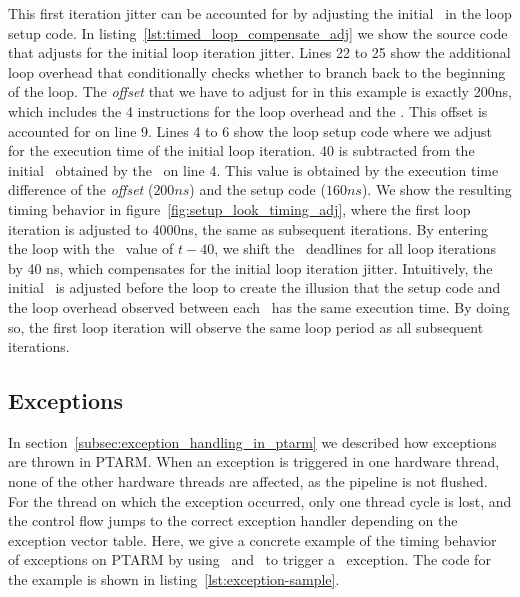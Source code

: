 This first iteration jitter can be accounted for by adjusting the initial \deadlinet\ in the loop setup code.
In listing~\ref{lst:timed_loop_compensate_adj} we show the source code that adjusts for the initial loop iteration jitter.
Lines 22 to 25 show the additional loop overhead that conditionally checks whether to branch back to the beginning of the loop.
The \emph{offset} that we have to adjust for in this example is exactly 200ns, which includes the 4 instructions for the loop overhead and the \delayuntil. 
This offset is accounted for on line 9.
Lines 4 to 6 show the loop setup code where we adjust for the execution time of the initial loop iteration.
40 is subtracted from the initial \deadlinet\ obtained by the \gettime\ on line 4.
This value is obtained by the execution time difference of the \emph{offset} ($200ns$) and the setup code ($160ns$).
We show the resulting timing behavior in figure~\ref{fig:setup_look_timing_adj}, where the first loop iteration is adjusted to 4000ns, the same as subsequent iterations.
By entering the loop with the \deadlinet\ value of $t-40$, we shift the \delayuntil\ deadlines for all loop iterations by 40 ns, which compensates for the initial loop iteration jitter.   
Intuitively, the initial \deadlinet\ is adjusted before the loop to create the illusion that the setup code and the loop overhead observed between each \delayuntil\ has the same execution time.
By doing so, the first loop iteration will observe the same loop period as all subsequent iterations. 

\subsection{Exceptions}
\label{sec:exception_timing_example}
In section~\ref{subsec:exception_handling_in_ptarm} we described how exceptions are thrown in PTARM.
When an exception is triggered in one hardware thread, none of the other hardware threads are affected, as the pipeline is not flushed.
For the thread on which the exception occurred, only one thread cycle is lost, and the control flow jumps to the correct exception handler depending on the exception vector table.    
Here, we give a concrete example of the timing behavior of exceptions on PTARM by using \exceptiononexpire\ and \deactivateexception\ to trigger a \timerexpired\ exception.
The code for the example is shown in listing~\ref{lst:exception-sample}.

